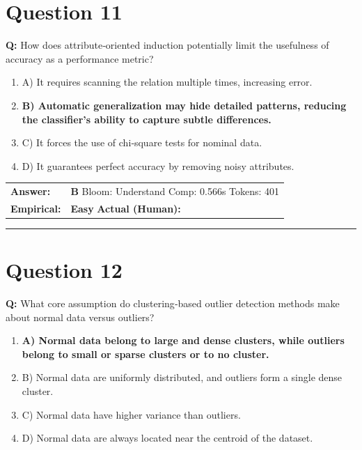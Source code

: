 \documentclass[9pt]{article}
\begin{document}
\section*{Question 11}

\textbf{Q:} How does attribute‑oriented induction potentially limit the usefulness of accuracy as a performance metric?

\begin{enumerate}[label=\textbf{\alph{*})}, nosep]
    \item A) It requires scanning the relation multiple times, increasing error.
    \item \textbf{B) Automatic generalization may hide detailed patterns, reducing the classifier’s ability to capture subtle differences.} %
    \item C) It forces the use of chi‑square tests for nominal data.
    \item D) It guarantees perfect accuracy by removing noisy attributes.

\end{enumerate}

\begin{tabular}{@{}l p{10.5cm}@{}}
\textbf{Answer:} & \textbf{B} \hspace{1em} Bloom: Understand \hspace{1em} Comp: 0.566s \hspace{1em} Tokens: 401 \\
\textbf{Empirical:} & \textbf{Easy} \hspace{1em} \textbf{Actual (Human):} \underline{\hspace{5cm}}
\end{tabular}

\vspace{0.2cm}
\rule{\textwidth}{0.4pt}
\vspace{0.2cm}


\section*{Question 12}

\textbf{Q:} What core assumption do clustering‑based outlier detection methods make about normal data versus outliers?

\begin{enumerate}[label=\textbf{\alph{*})}, nosep]
    \item \textbf{A) Normal data belong to large and dense clusters, while outliers belong to small or sparse clusters or to no cluster.} %
    \item B) Normal data are uniformly distributed, and outliers form a single dense cluster.
    \item C) Normal data have higher variance than outliers.
    \item D) Normal data are always located near the centroid of the dataset.

\end{enumerate}
\end{document}
